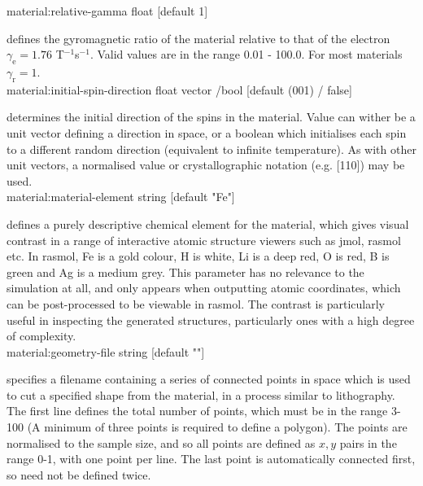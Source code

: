 
{\zicf material:relative-gamma float [default 1]} defines the gyromagnetic ratio
of the material relative to that of the electron $\gamma_{\mathrm{e}} = 1.76$ T$^{-1}$s$^{-1}$. Valid values are in the range 0.01 - 100.0. For most materials $\gamma_{\mathrm{r}} = 1$.\\

{\zicf material:initial-spin-direction float vector /bool [default (001) / false]} determines the initial direction of the spins in the material. Value can wither be a unit vector defining a direction in space, or a boolean which initialises each spin to a different random direction (equivalent to infinite temperature). As with other unit vectors, a  normalised value or crystallographic notation (e.g. [110]) may be used.\\

{\zicf material:material-element string [default "Fe"]} defines a purely descriptive chemical element for the material, which gives visual contrast in a range of interactive atomic structure viewers such as jmol, rasmol etc. In rasmol, Fe is a gold colour, H is white, Li is a deep red, O is red, B is green and Ag is a medium grey. This parameter has no relevance to the simulation at all, and only appears when outputting atomic coordinates, which can be post-processed to be viewable in rasmol. The contrast is particularly useful in inspecting the generated structures, particularly ones with a high degree of complexity.\\

{\zicf material:geometry-file string [default ""]} specifies a filename containing a series of connected points in space which is used to cut a specified shape from the material, in a process similar to lithography. The first line defines the total number of points, which must be in the range 3-100 (A minimum of three points is required to define a polygon). The points are normalised to the sample size, and so all points are defined as $x,y$ pairs in the range 0-1, with one point per line. The last point is automatically connected first, so need not be defined twice.\\

